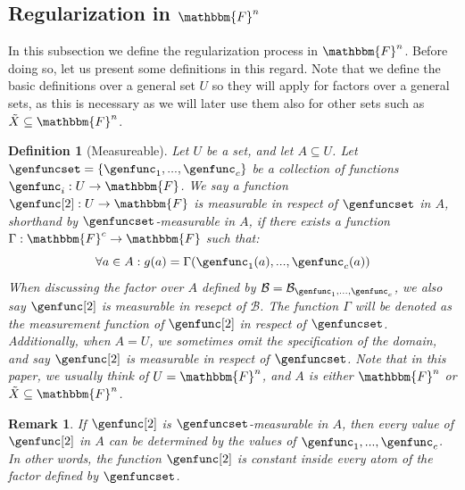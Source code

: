 \documentclass[10pt,a4paper]{article}
\newtheorem{definition}[theorem]{Definition}
\newtheorem{remark}[theorem]{Remark}
\newcommand{\set}[1]{\left\{ #1 \right\}}
\newcommand{\basefield}[0]{\mathbbm{F}}
\newcommand{\blocklength}[0]{n}
\newcommand{\field}[0]{\basefield^{\blocklength}}
\newcommand{\titlefield}[0]{\texorpdfstring{$\field$}{Fn}}
\newcommand{\funcdef}[3]{#1:#2\rightarrow#3}
\newcommand{\factor}[0]{\mathcal{B}}
\newcommand{\variety}{{\tilde{X}}}
\begin{document}
\subsection[Regularization in \titlefield]{Regularization in \titlefield}\label{subsec:regularization-in-Fn}
In this subsection we define the regularization process in $\field$.
Before doing so, let us present some definitions in this regard.
Note that we define the basic definitions over a general set $U$ so they will apply for factors over a general sets,
as this is necessary as we will later use them also for other sets such as $\variety \subseteq \field$.
\begin{definition}[Measureable]
    Let $U$ be a set, and let $A \subseteq U$.
    Let $\genfuncset = \set{\genfunc_1,...,\genfunc_c}$ be a collection of functions $\funcdef{\genfunc_i}{U}{\basefield}$.
    We say a function $\funcdef{\genfunc[2]}{U}{\basefield}$ is \emph{measurable in respect of $\genfuncset$ in $A$}, shorthand by \emph{$\genfuncset$-measurable in $A$},
    if there exists a function $\funcdef{\Gamma}{\basefield^c}{\basefield}$ such that:
    \[
        \forall a \in A: g(a) = \Gamma(\genfunc_1(a),...,\genfunc_c(a))
    \]
    When discussing the factor over $A$ defined by $\factor = \factor_{\genfunc_1,...,\genfunc_c}$,
    we also say $\genfunc[2]$ is \emph{measurable in resepct of $\factor$}.
    The function $\Gamma$ will be denoted as the \emph{measurement function} of $\genfunc[2]$ in respect of $\genfuncset$.
    Additionally, when $A = U$, we sometimes omit the specification of the domain, and say $\genfunc[2]$ is measurable in respect of $\genfuncset$.
    \newline
    Note that in this paper, we usually think of $U = \field$, and $A$ is either $\field$ or $\variety \subseteq \field$.
\end{definition}
\begin{remark}
    If $\genfunc[2]$ is $\genfuncset$-measurable in $A$, then every value of $\genfunc[2]$ in $A$
    can be determined by the values of $\genfunc_1,...,\genfunc_c$.
    In other words, the function $\genfunc[2]$ is constant inside every atom of the factor defined by $\genfuncset$.
\end{remark}
\end{document}
